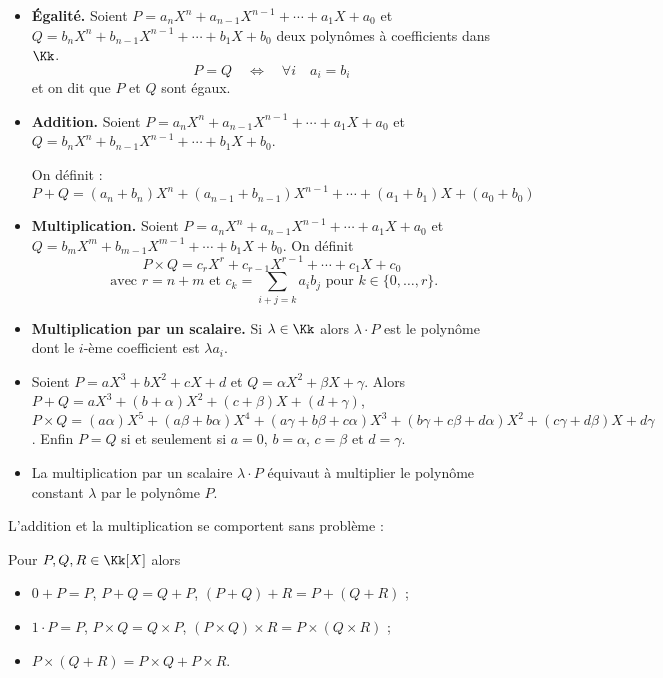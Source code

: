 \documentclass[class=report,crop=false]{standalone}
\begin{document}
\begin{itemize}
  \item \textbf{\'Egalité.}
Soient $P=a_nX^n+a_{n-1}X^{n-1}+\cdots + a_1X+a_0$ et
$Q=b_nX^n+b_{n-1}X^{n-1}+\cdots+b_1X+b_0$
deux polynômes à coefficients dans $\Kk$.
$$P=Q \quad \iff \quad   \forall i \quad a_i=b_i$$
et on dit que $P$ et $Q$ sont égaux.

  \item \textbf{Addition.} Soient  $P=a_nX^n+a_{n-1}X^{n-1}+\cdots + a_1X+a_0$ et
$Q=b_nX^n+b_{n-1}X^{n-1}+\cdots+b_1X+b_0$.

On définit :
$$P+Q = (a_n+b_n)X^n+(a_{n-1}+b_{n-1})X^{n-1}+\cdots
+(a_1+b_1)X+(a_0+b_0)$$

  \item \textbf{Multiplication.}
Soient  $P=a_nX^n+a_{n-1}X^{n-1}+\cdots + a_1X+a_0$ et
$Q=b_mX^m+b_{m-1}X^{m-1}+\cdots+b_1X+b_0$. On définit
$$P \times Q= c_rX^r+c_{r-1}X^{r-1}+\cdots
+c_1X+c_0$$
$$\text{  avec } r=n+m \text{ et } c_k=\sum_{i+j=k}a_ib_j  \text{ pour }k\in \{0,\ldots, r\}.$$

  \item \textbf{Multiplication par un scalaire.}
Si $\lambda \in \Kk$ alors $\lambda \cdot P$ est le polynôme dont le $i$-ème coefficient
est $\lambda a_i$.
\end{itemize}


\begin{exemple}
\sauteligne
\begin{itemize}
  \item Soient $P=aX^3+bX^2+cX+d$ et $Q=\alpha X^2+\beta X + \gamma$.
Alors $P+Q =  aX^3+(b+\alpha)X^2+(c+\beta)X+(d+\gamma)$,
$P\times Q = (a\alpha)X^5+(a\beta+b\alpha)X^4+(a\gamma+b\beta+c\alpha)X^3
+(b\gamma+c\beta+d\alpha)X^2+(c\gamma+d\beta)X + d\gamma$.
Enfin $P=Q$ si et seulement si $a=0$, $b=\alpha$, $c=\beta$ et $d=\gamma$.

  \item La multiplication par un scalaire $\lambda \cdot P$ équivaut à multiplier
le polynôme constant $\lambda$ par le polynôme $P$.
\end{itemize}

\end{exemple}




L'addition et la multiplication se comportent sans problème :
\begin{proposition}
Pour $P,Q,R \in \Kk[X]$ alors
\begin{itemize}
  \item $0+P=P$, \quad $P+Q=Q+P$, \quad $(P+Q)+R=P+(Q+R)$ ;
  \item $1\cdot P = P$, \quad $P\times Q=Q \times P$, \quad $(P \times Q) \times R=P \times (Q \times R)$ ;
  \item $P\times (Q+R)=P\times Q + P \times R$.
\end{itemize}
\end{proposition}
\end{document}
